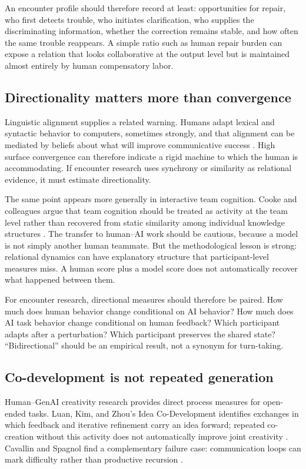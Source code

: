 \documentclass[11pt]{article}
\begin{document}
An encounter profile should therefore record at least: opportunities for repair, who first detects trouble, who initiates clarification, who supplies the discriminating information, whether the correction remains stable, and how often the same trouble reappears. A simple ratio such as human repair burden can expose a relation that looks collaborative at the output level but is maintained almost entirely by human compensatory labor.

\subsection{Directionality matters more than convergence}

Linguistic alignment supplies a related warning. Humans adapt lexical and syntactic behavior to computers, sometimes strongly, and that alignment can be mediated by beliefs about what will improve communicative success \citep{BraniganEtAl2010Alignment}. High surface convergence can therefore indicate a rigid machine to which the human is accommodating. If encounter research uses synchrony or similarity as relational evidence, it must estimate directionality.

The same point appears more generally in interactive team cognition. Cooke and colleagues argue that team cognition should be treated as activity at the team level rather than recovered from static similarity among individual knowledge structures \citep{CookeEtAl2013Interactive}. The transfer to human--AI work should be cautious, because a model is not simply another human teammate. But the methodological lesson is strong: relational dynamics can have explanatory structure that participant-level measures miss. A human score plus a model score does not automatically recover what happened between them.

For encounter research, directional measures should therefore be paired. How much does human behavior change conditional on AI behavior? How much does AI task behavior change conditional on human feedback? Which participant adapts after a perturbation? Which participant preserves the shared state? ``Bidirectional'' should be an empirical result, not a synonym for turn-taking.

\subsection{Co-development is not repeated generation}

Human--GenAI creativity research provides direct process measures for open-ended tasks. Luan, Kim, and Zhou's Idea Co-Development identifies exchanges in which feedback and iterative refinement carry an idea forward; repeated co-creation without this activity does not automatically improve joint creativity \citep{LuanKimZhou2025Augmented}. Cavallin and Spagnol find a complementary failure case: communication loops can mark difficulty rather than productive recursion \citep{CavallinSpagnol2026Sweat}.
\end{document}
